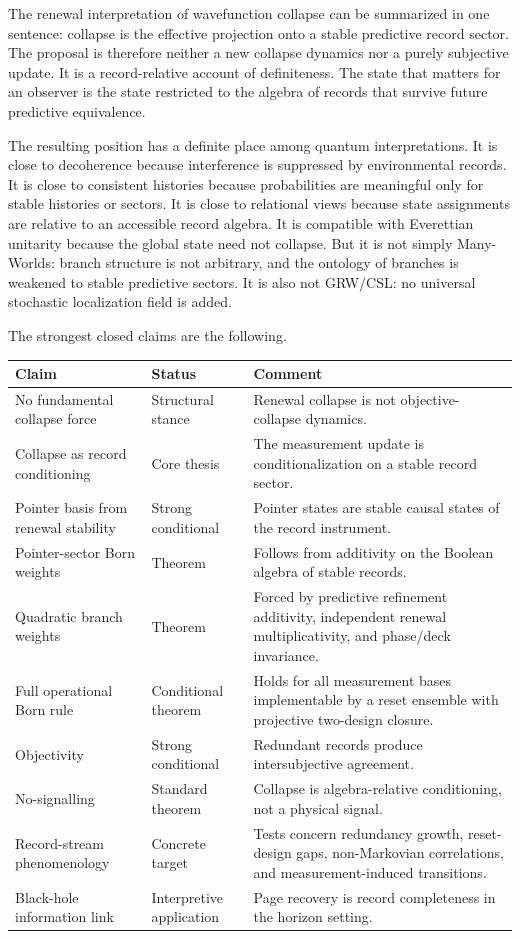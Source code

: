 \documentclass[11pt]{article}
\numberwithin{equation}{section}
\theoremstyle{definition}
\theoremstyle{remark}
\begin{document}
The renewal interpretation of wavefunction collapse can be summarized in one sentence: collapse is the effective projection onto a stable predictive record sector.  The proposal is therefore neither a new collapse dynamics nor a purely subjective update.  It is a record-relative account of definiteness.  The state that matters for an observer is the state restricted to the algebra of records that survive future predictive equivalence.

The resulting position has a definite place among quantum interpretations.  It is close to decoherence because interference is suppressed by environmental records.  It is close to consistent histories because probabilities are meaningful only for stable histories or sectors.  It is close to relational views because state assignments are relative to an accessible record algebra.  It is compatible with Everettian unitarity because the global state need not collapse.  But it is not simply Many-Worlds: branch structure is not arbitrary, and the ontology of branches is weakened to stable predictive sectors.  It is also not GRW/CSL: no universal stochastic localization field is added.

The strongest closed claims are the following.
\begin{center}
\small
\renewcommand{\arraystretch}{1.12}
\begin{tabularx}{\textwidth}{@{}p{}p{}X@{}}
\toprule
\textbf{Claim} & \textbf{Status} & \textbf{Comment}\\
\midrule
No fundamental collapse force & Structural stance & Renewal collapse is not objective-collapse dynamics.\\
Collapse as record conditioning & Core thesis & The measurement update is conditionalization on a stable record sector.\\
Pointer basis from renewal stability & Strong conditional & Pointer states are stable causal states of the record instrument.\\
Pointer-sector Born weights & Theorem & Follows from additivity on the Boolean algebra of stable records.\\
Quadratic branch weights & Theorem & Forced by predictive refinement additivity, independent renewal multiplicativity, and phase/deck invariance.\\
Full operational Born rule & Conditional theorem & Holds for all measurement bases implementable by a reset ensemble with projective two-design closure.\\
Objectivity & Strong conditional & Redundant records produce intersubjective agreement.\\
No-signalling & Standard theorem & Collapse is algebra-relative conditioning, not a physical signal.\\
Record-stream phenomenology & Concrete target & Tests concern redundancy growth, reset-design gaps, non-Markovian correlations, and measurement-induced transitions.\\
Black-hole information link & Interpretive application & Page recovery is record completeness in the horizon setting.\\
\bottomrule
\end{tabularx}
\end{center}
\end{document}
